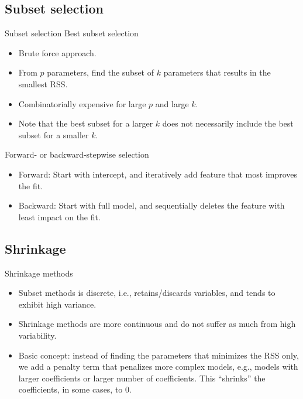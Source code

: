 \documentclass[aspectratio=169]{beamer}
\begin{document}
\subsection{Subset selection}

\begin{frame}{Subset selection}
    Best subset selection
    \begin{itemize}
        \item Brute force approach.
        \item From $p$ parameters, find the subset of $k$ parameters that results in the smallest RSS.
        \item Combinatorially expensive for large $p$ and large $k$.
        \item Note that the best subset for a larger $k$ does not necessarily include the best subset for a smaller $k$.
    \end{itemize}
    Forward- or backward-stepwise selection
    \begin{itemize}
        \item Forward: Start with intercept, and iteratively add feature that most improves the fit.
        \item Backward: Start with full model, and sequentially deletes the feature with least impact on the fit.
    \end{itemize}
\end{frame}


\subsection{Shrinkage}

\begin{frame}{Shrinkage methods}
    \begin{itemize}
        \item Subset methods is discrete, i.e., retains/discards variables, and tends to exhibit high variance.
        \item Shrinkage methods are more continuous and do not suffer as much from high variability.
        \item Basic concept: instead of finding the parameters that minimizes the RSS only, we add a penalty term that penalizes more complex models, e.g., models with larger coefficients or larger number of coefficients. This ``shrinks'' the coefficients, in some cases, to 0.
    \end{itemize}
\end{frame}
\end{document}
